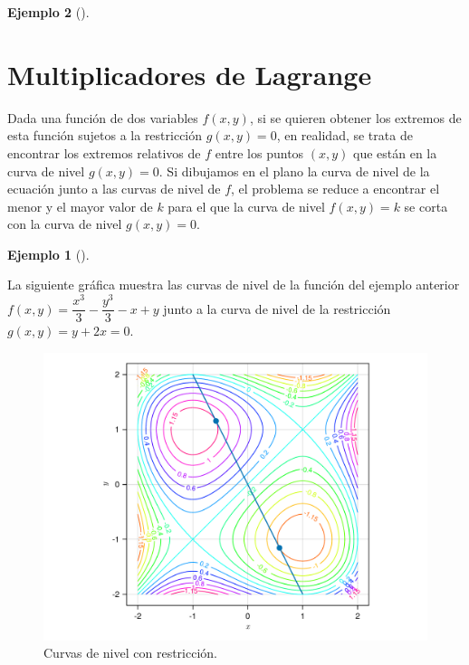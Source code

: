 \documentclass[
  a4paper,
]{scrreport}
\theoremstyle{definition}
\newtheorem{example}{Ejemplo}[chapter]
\theoremstyle{plain}
\theoremstyle{definition}
\theoremstyle{definition}
\theoremstyle{plain}
\theoremstyle{plain}
\theoremstyle{remark}
\begin{document}
\begin{example}[]
\section{Multiplicadores de Lagrange}\label{multiplicadores-de-lagrange}

Dada una función de dos variables \(f(x,y)\), si se quieren obtener los
extremos de esta función sujetos a la restricción \(g(x,y)=0\), en
realidad, se trata de encontrar los extremos relativos de \(f\) entre
los puntos \((x,y)\) que están en la curva de nivel \(g(x,y)=0\). Si
dibujamos en el plano la curva de nivel de la ecuación junto a las
curvas de nivel de \(f\), el problema se reduce a encontrar el menor y
el mayor valor de \(k\) para el que la curva de nivel \(f(x,y)=k\) se
corta con la curva de nivel \(g(x,y)=0\).

\begin{example}[]\protect\hypertarget{exm-curvas-nivel-restricciones}{}\label{exm-curvas-nivel-restricciones}

La siguiente gráfica muestra las curvas de nivel de la función del
ejemplo anterior \(f(x,y)=\dfrac{x^3}{3}-\dfrac{y^3}{3}-x+y\) junto a la
curva de nivel de la restricción \(g(x,y)=y+2x=0\).

\begin{figure}[H]

{\centering \includegraphics{img/derivadas-funciones-varias-variables/multiplicadores-lagrange.pdf}

}

\caption{Curvas de nivel con restricción.}

\end{figure}%


\end{example}
\end{example}
\end{document}
